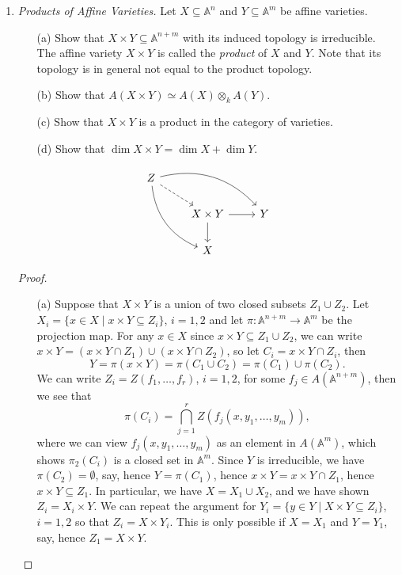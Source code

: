 \documentclass[12pt]{article}
\newcommand{\A}{\mathbb{A}}
\theoremstyle{definition}
\begin{document}
\begin{enumerate} [label=\textbf{\arabic*.}, leftmargin=-0.05em]
\item \textit{Products of Affine Varieties.} Let $X \subseteq \A^n$ and $Y \subseteq \A^m$ be affine varieties.
\begin{itemize}
    \item[(a)] Show that $X \times Y \subseteq \A^{n + m}$ with its induced topology is irreducible. The affine variety $X \times Y$ is called the \textit{product} of $X$ and $Y$. Note that its topology is in general not equal to the product topology.
    \item[(b)] Show that $A(X \times Y) \simeq A(X) \otimes_k A(Y)$.
    \item[(c)] Show that $X \times Y$ is a product in the category of varieties.
    \item[(d)] Show that $\dim{X \times Y} = \dim{X} + \dim{Y}$.
\end{itemize}
\[ \begin{tikzcd}
    Z \arrow[rdd, bend right] \arrow[rrd, bend left] \arrow[rd, dashed] &                                &   \\
                                                                        & X \times Y \arrow[d] \arrow[r] & Y \\
                                                                        & X                              &  
\end{tikzcd} \]

\begin{proof} $ $ \vspace{0pt}
    \begin{itemize}
        \item[(a)] Suppose that $X \times Y$ is a union of two closed subsets $Z_1 \cup Z_2$. Let $X_i = \{ x \in X \mid x \times Y \subseteq Z_i \}$, $i = 1, 2$ and let $\pi : \A^{n + m} \to \A^m$ be the projection map. For any $x \in X$ since $x \times Y \subseteq Z_1 \cup Z_2$, we can write $x \times Y = (x \times Y \cap Z_1) \cup (x \times Y \cap Z_2)$, so let $C_i = x \times Y \cap Z_i$, then
        \begin{equation*}
            Y = \pi(x \times Y) = \pi(C_1 \cup C_2) = \pi(C_1) \cup \pi(C_2).
        \end{equation*}
        We can write $Z_i = Z(f_1, \dots, f_r)$, $i = 1, 2$, for some $f_j \in A(\A^{n + m})$, then we see that
        \begin{equation*}
            \pi(C_i) = \bigcap_{j = 1}^r Z(f_j(x, y_1, \dots, y_m)),
        \end{equation*}
        where we can view $f_j(x, y_1, \dots, y_m)$ as an element in $A(\A^m)$, which shows $\pi_2(C_i)$ is a closed set in $\A^m$. Since $Y$ is irreducible, we have $\pi(C_2) = \emptyset$, say, hence $Y = \pi(C_1)$, hence $x \times Y = x \times Y \cap Z_1$, hence $x \times Y \subseteq Z_1$. In particular, we have $X = X_1 \cup X_2$, and we have shown $Z_i = X_i \times Y$. We can repeat the argument for $Y_i = \{y \in Y \mid X \times Y \subseteq Z_i\}$, $i = 1, 2$ so that $Z_i = X \times Y_i$. This is only possible if $X = X_1$ and $Y = Y_1$, say, hence $Z_1 = X \times Y$.
        


\end{itemize}
\end{proof}
\end{enumerate}
\end{document}
